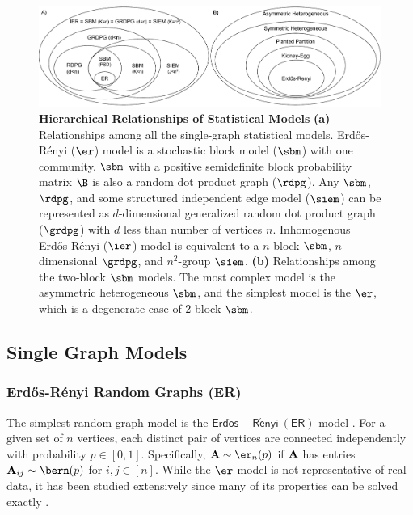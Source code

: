 \begin{figure}
    \centering
    \includegraphics[width=\textwidth]{figures/dnd/models_combined}
    \caption{\textbf{Hierarchical Relationships of Statistical Models} 
    \textbf{(a)} Relationships among all the single-graph statistical models. Erd\H os-R\'enyi ($\er$) model is a stochastic block model ($\sbm$) with one community. $\sbm$ with a positive semidefinite block probability matrix $\B$ is also a random dot product graph ($\rdpg$). Any $\sbm$, $\rdpg$, and some structured independent edge model ($\siem$) can be represented as $d$-dimensional generalized random dot product graph ($\grdpg$) with $d$ less than number of vertices $n$. Inhomogenous Erd\H os-R\'enyi ($\ier$) model is equivalent to a $n$-block $\sbm$, $n$-dimensional $\grdpg$, and $n^2$-group $\siem$.
    \textbf{(b)} Relationships among the two-block $\sbm$ models. The most complex model is the asymmetric heterogeneous $\sbm$, and the simplest model is the $\er$, which is a degenerate case of 2-block $\sbm$.}
    \label{fig:models}
\end{figure}

\subsection{Single Graph Models}\label{sec:single_graph_models}
\subsubsection{Erd\H os-R\'enyi Random Graphs (ER)}\label{sec:uer}
The simplest random graph model is the $\mathsf{Erd\ddot{o}s-R\acute{e}nyi~(ER)}$ model \citep{Erdos1959-zf}. For a given set of $n$ vertices, each distinct pair of vertices are connected independently with probability $p \in [0, 1]$. Specifically, $\A \sim\er_n(p)$ if $\operatorname{\mathbf{A}}$ has entries $\A_{ij}\sim\bern(p)$ for $i, j \in [n]$. While the $\er$ model is not representative of real data, it has been studied extensively since many of its properties can be solved exactly  \citep{newman2003random,Rukhin2010}.  

